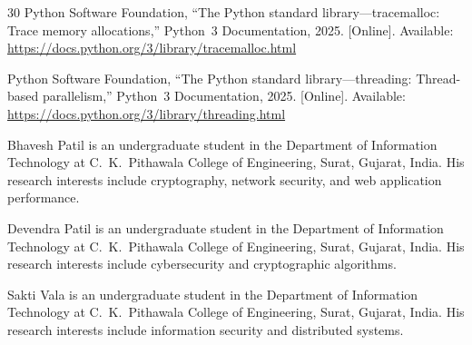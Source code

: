\documentclass[journal]{IEEEtran}
\begin{document}
\begin{thebibliography}{30}
Python Software Foundation, ``The Python standard library---tracemalloc: Trace memory allocations,'' Python~3 Documentation, 2025. [Online]. Available: \url{https://docs.python.org/3/library/tracemalloc.html}

Python Software Foundation, ``The Python standard library---threading: Thread-based parallelism,'' Python~3 Documentation, 2025. [Online]. Available: \url{https://docs.python.org/3/library/threading.html}

\end{thebibliography}


\begin{IEEEbiographynophoto}{Bhavesh Patil}
is an undergraduate student in the Department of Information Technology at C.~K.~Pithawala College of Engineering, Surat, Gujarat, India. His research interests include cryptography, network security, and web application performance.
\end{IEEEbiographynophoto}

\begin{IEEEbiographynophoto}{Devendra Patil}
is an undergraduate student in the Department of Information Technology at C.~K.~Pithawala College of Engineering, Surat, Gujarat, India. His research interests include cybersecurity and cryptographic algorithms.
\end{IEEEbiographynophoto}

\begin{IEEEbiographynophoto}{Sakti Vala}
is an undergraduate student in the Department of Information Technology at C.~K.~Pithawala College of Engineering, Surat, Gujarat, India. His research interests include information security and distributed systems.
\end{IEEEbiographynophoto}
\end{document}
